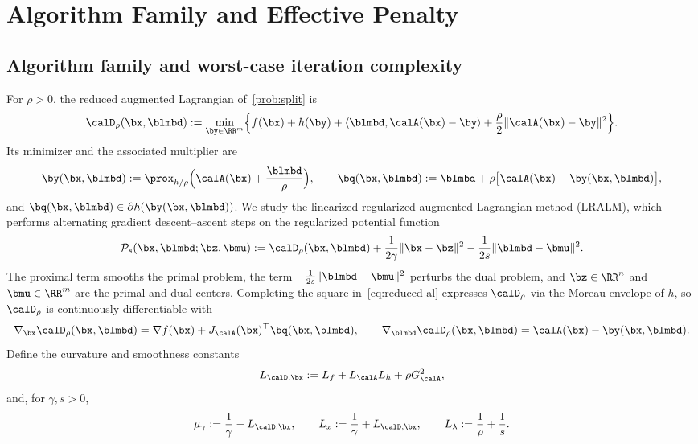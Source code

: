 \section{Algorithm Family and Effective Penalty}
\label{sec:algorithm-framework}

\subsection{Algorithm family and worst-case iteration complexity}
\label{subsec:algorithm-family}

For \(\rho>0\), the reduced augmented Lagrangian of~\eqref{prob:split} is
\begin{equation}
    \calD_\rho(\bx,\blmbd)
    :=\min_{\by\in\RR^m}\Bigl\{f(\bx)+h(\by)+\langle\blmbd,\calA(\bx)-\by\rangle
    +\frac{\rho}{2}\|\calA(\bx)-\by\|^2\Bigr\}.
    \label{eq:reduced-al}
\end{equation}
Its minimizer and the associated multiplier are
\begin{equation}
    \by(\bx,\blmbd):=\prox_{h/\rho}\Bigl(\calA(\bx)+\frac{\blmbd}{\rho}\Bigr),
    \qquad
    \bq(\bx,\blmbd):=\blmbd+\rho\bigl[\calA(\bx)-\by(\bx,\blmbd)\bigr],
    \label{eq:prox-multiplier}
\end{equation}
and \(\bq(\bx,\blmbd)\in\partial h(\by(\bx,\blmbd))\).
We study the linearized regularized augmented Lagrangian method
(LRALM), which performs alternating gradient descent--ascent steps on the
regularized potential function
\begin{equation}
    \mathcal P_s(\bx,\blmbd;\bz,\bmu)
    :=\calD_\rho(\bx,\blmbd)+\frac{1}{2\gamma}\|\bx-\bz\|^2
    -\frac{1}{2s}\|\blmbd-\bmu\|^2 .
    \label{eq:potential}
\end{equation}
The proximal term smooths the primal problem, the term
\(-\frac{1}{2s}\|\blmbd-\bmu\|^2\) perturbs the dual problem, and
\(\bz\in\RR^n\) and \(\bmu\in\RR^m\) are the primal and dual centers.
Completing the square in~\eqref{eq:reduced-al} expresses \(\calD_\rho\) via the
Moreau envelope of \(h\), so \(\calD_\rho\) is continuously differentiable with
\[
    \nabla_{\bx}\calD_\rho(\bx,\blmbd)
    =\nabla f(\bx)+J_{\calA}(\bx)^\top\bq(\bx,\blmbd),
    \qquad
    \nabla_{\blmbd}\calD_\rho(\bx,\blmbd)
    =\calA(\bx)-\by(\bx,\blmbd).
\]
Define the curvature and smoothness constants
\begin{equation}
    L_{\calD,\bx}
    :=L_f+L_{\calA}L_h+\rho G_{\calA}^{2},
    \label{eq:x-weak-convexity-modulus}
\end{equation}
and, for \(\gamma,s>0\),
\[
    \mu_\gamma:=\frac{1}{\gamma}-L_{\calD,\bx},
    \qquad
    L_x:=\frac{1}{\gamma}+L_{\calD,\bx},
    \qquad
    L_\lambda:=\frac{1}{\rho}+\frac{1}{s}.
\]

